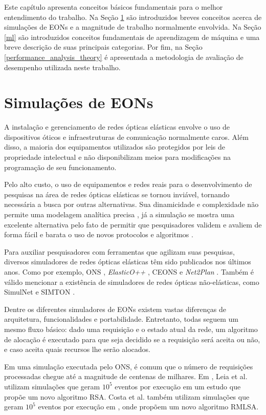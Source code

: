 Este capítulo apresenta conceitos básicos fundamentais para o melhor entendimento do trabalho. Na Seção \ref{ft_eon} são introduzidos breves conceitos acerca de simulações de EONs e a magnitude de trabalho normalmente envolvida. Na Seção \ref{ml} são introduzidos conceitos fundamentais de aprendizagem de máquina e uma breve descrição de suas principais categorias. Por fim, na Seção \ref{performance_analysis_theory} é apresentada a metodologia de avaliação de desempenho utilizada neste trabalho.

\section{Simulações de EONs}%
\label{ft_eon}

A instalação e gerenciamento de redes ópticas elásticas envolve o uso de dispositivos óticos e infraestruturas de comunicação normalmente caros. Além disso, a maioria dos equipamentos utilizados são protegidos por leis de propriedade intelectual e não disponibilizam meios para modificações na programação de seu funcionamento.

Pelo alto custo, o uso de equipamentos e redes reais para o desenvolvimento de pesquisas na área de redes ópticas elásticas se tornou inviável, tornando necessária a busca por outras alternativas. Sua dinamicidade e complexidade não permite uma modelagem analítica precisa \cite{costa2016ons}, já a simulação se mostra uma excelente alternativa pelo fato de permitir que pesquisadores validem e avaliem de forma fácil e barata o uso de novos protocolos e algoritmos \cite{simulnet2009}.

Para auxiliar pesquisadores com ferramentas que agilizam suas pesquisas, diversos simuladores de redes ópticas elásticas têm sido publicados nos últimos anos. Como por exemplo, \acrfull{ONS} \cite{costa2016ons}, \textit{ElasticO++} \cite{TESSINARI201695}, \acrfull{CEONS} \cite{ceons2015} e \textit{Net2Plan} \cite{net2plan}. Também é válido mencionar a existência de simuladores de redes ópticas não-elásticas, como SimulNet \cite{simulnet2009} e SIMTON \cite{chaves2010}.

Dentre os diferentes simuladores de EONs existem vastas diferenças de arquitetura, funcionalidades e portabilidade. Entretanto, todas seguem um mesmo fluxo básico: dado uma requisição e o estado atual da rede, um algoritmo de alocação é executado para que seja decidido se a requisição será aceita ou não, e caso aceita quais recursos lhe serão alocados.

Em uma simulação executada pelo \acrfull{ONS}, é comum que o número de requisições processadas chegue até a magnitude de centenas de milhares. Em \cite{leia2019}, Leia et al. utilizam simulações que geram $10^5$ eventos por execução em um estudo que propõe um novo algoritmo RSA. Costa et al. também utilizam simulações que geram $10^5$ eventos por execução em \cite{rmlsaacosta2020}, onde propõem um novo algoritmo RMLSA.

